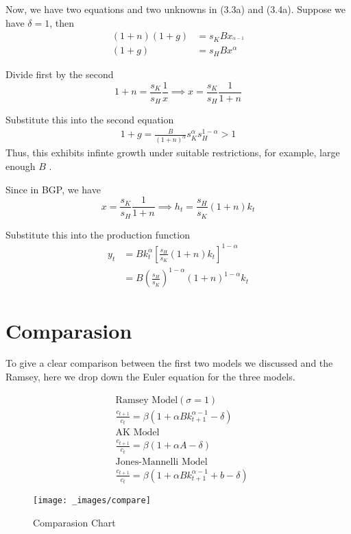 \documentclass[twocolumn, fleqn]{article}
\begin{document}
		Now, we have two equations and two unknowns in (3.3a) and (3.4a).
		Suppose we have $\delta=1$, then
		\begin{align*}
		(1+n)(1+g) &= s_K B x_^{\alpha-1}\\
		(1+g) &= s_H B x^{\alpha}
		\end{align*}

		Divide first by the second
		\begin{equation*}
			1+n = \frac{s_K}{s_H} \frac{1}{x} \implies x = \frac{s_K}{s_H} \frac{1}{1+n}
		\end{equation*}

		Substitute this into the second equation
		\begin{align*}
			1+g = \frac{B}{(1+n)^\alpha} s_K^{\alpha} s_H^{1-\alpha}>1
		\end{align*}
		Thus, this exhibits infinte growth under suitable restrictions, for example, large enough $B$ .

		Since in BGP, we have
		\[x = \frac{s_K}{s_H} \frac{1}{1+n} \implies h_t = \frac{s_H}{s_K}(1+n)k_t\]

		Substitute this into the production function
		\begin{align*}
			y_t &= B k_t^{\alpha}\left[ \frac{s_H}{s_K}(1+n)k_t \right]^{1-\alpha}\\
			 &= B \left( \frac{s_H}{s_K} \right)^{1-\alpha}(1+n)^{1-\alpha}k_t
		\end{align*}

	\section{Comparasion}
		To give a clear comparison between the first two models we discussed and the Ramsey, here we drop down the Euler
		equation for the three models.

		\begin{align*}
			&\text{Ramsey Model} (\sigma=1)\\
			&\frac{c_{t+1}}{c_t} = \beta (1+\alpha B k_{t+1}^{\alpha-1}-\delta)
			\tag{a}\\
			&\text{AK Model}\\
			&\frac{c_{t+1}}{c_t} = \beta (1+\alpha A -\delta) \tag{b}\\
			&\text{Jones-Mannelli Model}\\
			&\frac{c_{t+1}}{c_t} =
			\beta (1+\alpha B k_{t+1}^{\alpha-1}+b-\delta) \tag{c}
		\end{align*}

		\begin{figure}[htb]
			\center
			\texttt{[image: \_images/compare]}
			\caption{Comparasion Chart}
		\end{figure}
\end{document}
